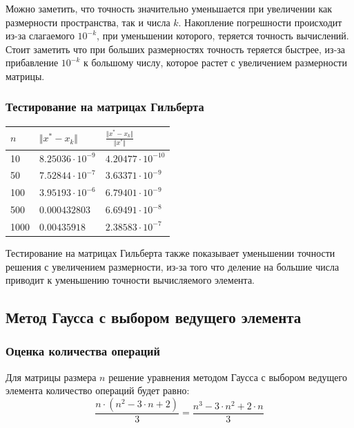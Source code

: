 \documentclass[english]{article}
\begin{document}
Можно заметить, что точность значительно уменьшается при увеличении
как размерности пространства, так и числа \(k\). Накопление
погрешности происходит из-за слагаемого \(10^{-k}\), при уменьшении
которого, теряется точность вычислений. Стоит заметить что при больших
размерностях точность теряется быстрее, из-за прибавление \(10^{-k}\)
к большому числу, которое растет с увеличением размерности матрицы.

\subsubsection{Тестирование на матрицах Гильберта}
\begin{center}
  \begin{longtable}{l|l|l}
    \(n\) & \(\Vert x^* - x_k \Vert\) & \(\frac{\Vert x^* - x_k \Vert}{\Vert x^* \Vert}\) \\
    \hline
    10 & \(8.25036\cdot 10^{-9}\) & \(4.20477\cdot 10^{-10}\) \\
    50 & \(7.52844\cdot 10^{-7}\) & \(3.63371\cdot 10^{-9}\) \\
    100 & \(3.95193\cdot 10^{-6}\) & \(6.79401\cdot 10^{-9}\) \\
    500 & \(0.000432803\) & \(6.69491\cdot 10^{-8}\) \\
    1000 & \(0.00435918 \) & \(2.38583\cdot 10^{-7}\) 
  \end{longtable}
\end{center}

Тестирование на матрицах Гильберта также показывает уменьшении
точности решения с увеличением размерности, из-за того что деление на
большие числа приводит к уменьшению точности вычисляемого элемента.

\subsection{Метод Гаусса с выбором ведущего элемента}
\subsubsection{Оценка количества операций}
Для матрицы размера \(n\) решение уравнения методом Гаусса с выбором ведущего элемента количество операций будет равно:
\[ \frac{n\cdot(n^2 - 3\cdot n + 2)}{3} = \frac{n^3 - 3\cdot n^2 + 2\cdot n}{3} \]
\end{document}
